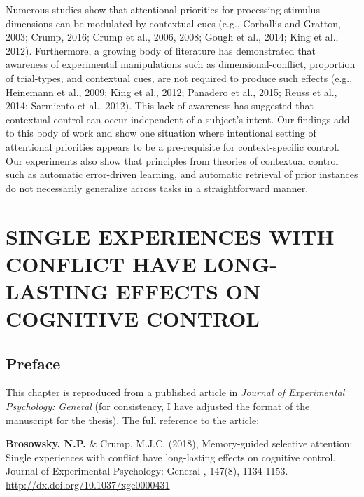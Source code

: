 \documentclass[]{DissertateCUNY}
\begin{document}
Numerous studies show that attentional priorities for processing
stimulus dimensions can be modulated by contextual cues (e.g., Corballis
and Gratton, 2003; Crump, 2016; Crump et al., 2006, 2008; Gough et al.,
2014; King et al., 2012). Furthermore, a growing body of literature has
demonstrated that awareness of experimental manipulations such as
dimensional-conflict, proportion of trial-types, and contextual cues,
are not required to produce such effects (e.g., Heinemann et al., 2009;
King et al., 2012; Panadero et al., 2015; Reuss et al., 2014; Sarmiento
et al., 2012). This lack of awareness has suggested that contextual
control can occur independent of a subject's intent. Our findings add to
this body of work and show one situation where intentional setting of
attentional priorities appears to be a pre-requisite for
context-specific control. Our experiments also show that principles from
theories of contextual control such as automatic error-driven learning,
and automatic retrieval of prior instances do not necessarily generalize
across tasks in a straightforward manner.

\FloatBarrier

\newpage
{}
\fancyhead[R]{\thepage}
\fancyfoot[C]{}

\chapter{SINGLE EXPERIENCES WITH CONFLICT HAVE LONG-LASTING EFFECTS ON COGNITIVE CONTROL}

\hypertarget{preface-1}{%
\section{Preface}\label{preface-1}}

This chapter is reproduced from a published article in
\textit{Journal of Experimental Psychology: General} (for consistency, I
have adjusted the format of the manuscript for the thesis). The full
reference to the article:

\vspace{1.5em}

\noindent \textbf{Brosowsky, N.P.} \& Crump, M.J.C. (2018),
Memory-guided selective attention: Single experiences with conflict have
long-lasting effects on cognitive control. Journal of Experimental
Psychology: General , 147(8), 1134-1153.
\url{http://dx.doi.org/10.1037/xge0000431} \vspace{1.5em}
\end{document}
